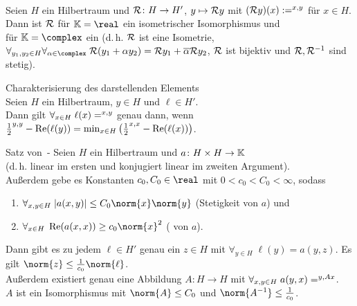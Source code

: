\begin{Kor}\\
    Seien $H$ ein Hilbertraum und $\R\colon H \rightarrow H'$, $y \mapsto \R y$ mit
    $(\R y)(x) := \sp{x, y}$ für $x \in H$.\\
    Dann ist $\R$ für $\KK = \real$ ein isometrischer Isomorphismus und\\
    für $\KK = \complex$ ein 
    (d.\,h. $\R$ ist eine Isometrie,\\
    $\forall_{y_1, y_2 \in H} \forall_{\alpha \in \complex}\;
    \R(y_1 + \alpha y_2) = \R y_1 + \overline{\alpha} \R y_2$,
    $\R$ ist bijektiv und $\R, \R^{-1}$ sind stetig).
\end{Kor}

\linie

\begin{Satz}{Charakterisierung des darstellenden Elements}\\
    Seien $H$ ein Hilbertraum, $y \in H$ und $\ell \in H'$.\\
    Dann gilt $\forall_{x \in H}\; \ell(x) = \sp{x, y}$
    genau dann, wenn\\
    $\frac{1}{2} \sp{y, y} - \Re(\ell(y)) =
    \min_{x \in H} \left(\frac{1}{2} \sp{x, x} - \Re(\ell(x))\right)$.
\end{Satz}

\linie

\begin{Satz}{Satz von \upshape\,\!-}
    Seien $H$ ein Hilbertraum und $a\colon H \times H \rightarrow \KK$ \\
    (d.\,h. linear im ersten und konjugiert linear im zweiten Argument).\\
    Außerdem gebe es Konstanten $c_0, C_0 \in \real$ mit $0 < c_0 < C_0 < \infty$, sodass
    \begin{enumerate}
        \item
        $\forall_{x, y \in H}\; |a(x, y)| \le C_0 \norm{x} \norm{y}$
        (Stetigkeit von $a$) und

        \item
        $\forall_{x \in H}\; \Re(a(x, x)) \ge c_0 \norm{x}^2$
        ( von $a$).
    \end{enumerate}
    Dann gibt es zu jedem $\ell \in H'$ genau ein $z \in H$ mit
    $\forall_{y \in H}\; \ell(y) = a(y, z)$.
    Es gilt $\norm{z} \le \frac{1}{c_0} \norm{\ell}$.\\
    Außerdem existiert genau eine Abbildung $A\colon H \rightarrow H$ mit
    $\forall_{x, y \in H}\; a(y, x) = \sp{y, Ax}$.\\
    $A$ ist ein Isomorphismus mit $\norm{A} \le C_0$ und
    $\norm{A^{-1}} \le \frac{1}{c_0}$.
\end{Satz}

\pagebreak
